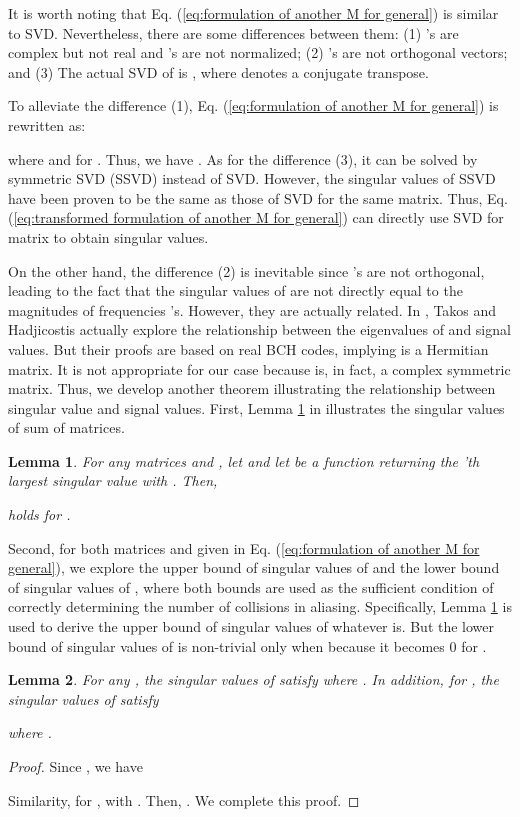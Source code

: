 \documentclass[journal,onecolumn,11pt]{IEEEtran}
\newtheorem{lemma}{Lemma}
\begin{document}
It is worth noting that Eq. (\ref{eq:formulation of another M for general}) is similar to SVD.
Nevertheless, there are some differences between them:
(1) 's are complex but not real and 's are not normalized;
(2) 's are not orthogonal vectors; and
(3) The actual SVD of  is , where  denotes a conjugate transpose.

To alleviate the difference (1), Eq. (\ref{eq:formulation of another M for general}) is rewritten as:
\small

\normalsize
where  and  for .
Thus, we have .
As for the difference (3), it can be solved by symmetric SVD (SSVD) \cite{Angelika1988} instead of SVD.
However, the singular values of SSVD have been proven to be the same as those of SVD for the same matrix.
Thus, Eq. (\ref{eq:transformed formulation of another M for general}) can directly use SVD for matrix  to obtain singular values.

On the other hand, the difference (2) is inevitable since 's are not orthogonal, leading to the fact that the singular values of  are not directly equal to the magnitudes of frequencies 's.
However, they are actually related.
In \cite{Takos2008}, Takos and Hadjicostis actually explore the relationship between the eigenvalues of  and signal values.
But their proofs are based on real BCH codes, implying  is a Hermitian matrix.
It is not appropriate for our case because  is, in fact, a complex symmetric matrix.
Thus, we develop another theorem illustrating the relationship between singular value and signal values.
First, Lemma \ref{lemma:singular value of sum of two matrices} in \cite{Hogben2007} illustrates the singular values of sum of matrices.
\begin{lemma}
\label{lemma:singular value of sum of two matrices}
For any matrices  and , let  and let  be a function returning the 'th largest singular value with .
Then,

holds for .
\end{lemma}
Second, for both matrices  and  given in Eq. (\ref{eq:formulation of another M for general}), we explore the upper bound of singular values of  and the lower bound of singular values of , where both bounds are used as the sufficient condition of correctly determining the number  of collisions in aliasing.
Specifically, Lemma \ref{lemma:singular value of sum of two matrices} is used to derive the upper bound of singular values of  whatever  is.
But the lower bound of singular values of  is non-trivial only when  because it becomes 0 for .
\begin{lemma}
\label{lemma:singular value and M}
For any , the singular values of  satisfy 
where .
In addition, for , the singular values of  satisfy

where .
\end{lemma}
\begin{proof}
Since , we have

Similarity, for ,  with . Then, . We complete this proof.
\end{proof}
\end{document}
